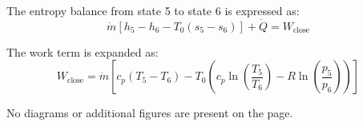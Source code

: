 The entropy balance from state 5 to state 6 is expressed as:  
\[
\dot{m} \left[ h_5 - h_6 - T_0 (s_5 - s_6) \right] + \dot{Q} = W_{\text{close}}
\]  

The work term is expanded as:  
\[
W_{\text{close}} = \dot{m} \left[ c_p (T_5 - T_6) - T_0 \left( c_p \ln \left( \frac{T_5}{T_6} \right) - R \ln \left( \frac{p_5}{p_6} \right) \right) \right]
\]  

No diagrams or additional figures are present on the page.